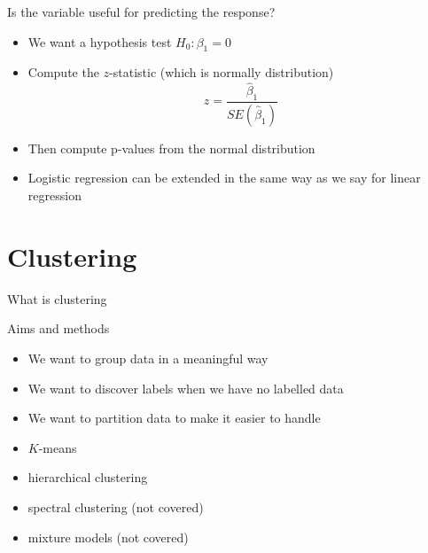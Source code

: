 \documentclass{bredelebeamer}
\begin{document}
\begin{frame}{Is the variable useful for predicting the response?}

\begin{exampleblock}

\begin{itemize}
	\item We want a hypothesis test $H_0: \beta_1 = 0$
	\item Compute the $z$-statistic (which is normally distribution)
	\begin{equation}
	z = \frac{\hat{\beta}_1}{SE(\hat{\beta}_1)}
	\end{equation}
	\item Then compute p-values from the normal distribution
	\item Logistic regression can be extended in the same way as we say for linear regression
\end{itemize}

\end{exampleblock}

\end{frame}

\section{Clustering}

\begin{frame}{What is clustering}
\begin{exampleblock}{Aims and methods}
	
	\begin{itemize}
		\item We want to group data in a meaningful way
		\item We want to discover labels when we have no labelled data
		\item We want to partition data to make it easier to handle
		\item $K$-means
		\item hierarchical clustering
		\item spectral clustering (not covered)
		\item mixture models (not covered)
	\end{itemize}
\end{exampleblock}
\end{frame}
\end{document}
